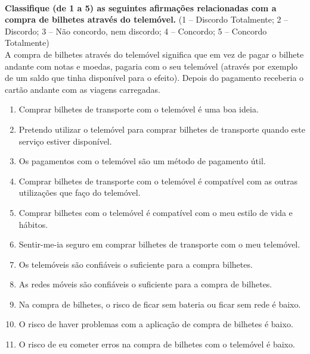 ~\\\textbf{Classifique (de 1 a 5) as seguintes afirmações relacionadas com a compra de bilhetes através do telemóvel.} (1 – Discordo Totalmente; 2 – Discordo; 3 – Não concordo, nem discordo; 4 – Concordo; 5 – Concordo Totalmente) 
\\A compra de bilhetes através do telemóvel significa que em vez de pagar o bilhete andante com notas e moedas, pagaria com o seu telemóvel (através por exemplo de um saldo que tinha disponível para o efeito). Depois do pagamento receberia o cartão andante com as viagens carregadas.
\begin{enumerate}
\item Comprar bilhetes de transporte com o telemóvel é uma boa ideia.	
\item Pretendo utilizar o telemóvel para comprar bilhetes de transporte quando este serviço estiver disponível.	
\item Os pagamentos com o telemóvel são um método de pagamento útil.	
\item Comprar bilhetes de transporte com o telemóvel é compatível com as outras utilizações que faço do telemóvel.	
\item Comprar bilhetes com o telemóvel é compatível com o meu estilo de vida e hábitos.	
\item Sentir-me-ia seguro em comprar bilhetes de transporte com o meu telemóvel.	
\item Os telemóveis são confiáveis o suficiente para a compra bilhetes.	
\item As redes móveis são confiáveis o suficiente para a compra de bilhetes.	
\item Na compra de bilhetes, o risco de ficar sem bateria ou ficar sem rede é baixo.	
\item O risco de haver problemas com a aplicação de compra de bilhetes é baixo.	
\item O risco de eu cometer erros na compra de bilhetes com o telemóvel é baixo.	
\end{enumerate}

